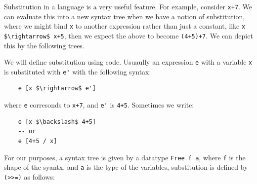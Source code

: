 \documentclass[a4paper,12pt]{article}
\theoremstyle{remark}
\begin{document}
Substitution in a language is a very useful feature. For example, consider \lstinline{x+7}. We can
evaluate this into a new syntax tree when we have a notion of substitution, where we might bind
\lstinline{x} to another expression rather than just a constant, like \lstinline{x $\rightarrow$ x+5},
then we expect the above to become \lstinline{(4+5)+7}. We can depict this by the following trees.

\begin{figure}[H]
\centering
\begin{subfigure}{.5\textwidth}
  \centering
\end{subfigure}%
\begin{subfigure}{.5\textwidth}
  \centering

\end{subfigure}
\end{figure}

We will define substitution using code. Usuaully an expression \lstinline{e} with a variable \lstinline{x}
is substituted with \lstinline{e'} with the following syntax:

\begin{lstlisting}
    e [x $\rightarrow$ e']  \end{lstlisting}

where \lstinline{e} corresonds to \lstinline{x+7}, and \lstinline{e'} is \lstinline{4+5}. Sometimes we write:

\begin{lstlisting}
    e [x $\backslash$ 4+5]
    -- or
    e [4+5 / x]  \end{lstlisting}

For our purposes, a syntax tree is given by a datatype \lstinline{Free f a}, where \lstinline{f} is the shape of the syantx,
and \lstinline{a} is the type of the variables, substitution is defined by \lstinline{(>>=)} as follows:
\end{document}
